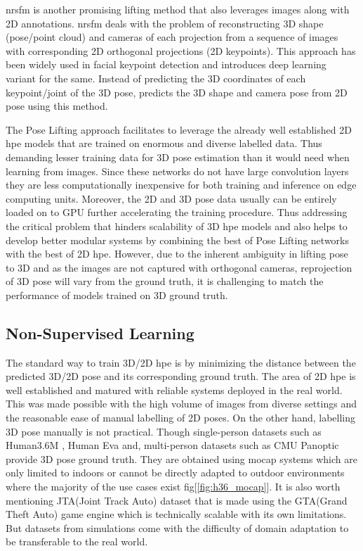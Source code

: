 \ac{nrsfm} is another promising lifting method that also leverages images along with 2D annotations. \ac{nrsfm} deals with the problem of reconstructing 3D shape (pose/point cloud) and cameras of each projection from a sequence of images with corresponding 2D orthogonal projections (2D keypoints). This approach has been widely used in facial keypoint detection and \cite{deepNRSFM} introduces deep learning variant for the same. Instead of predicting the 3D coordinates of each keypoint/joint of the 3D pose, \cite{DistillNRSfM, c3dpo, deepNRSFM, nrsfm++} predicts the 3D shape and camera pose from 2D pose using this method.

The Pose Lifting approach facilitates to leverage the already well established 2D \ac{hpe} models that are trained on enormous and diverse labelled data. Thus demanding lesser training data for 3D pose estimation than it would need when learning from images. Since these networks do not have large convolution layers they are less computationally inexpensive for both training and inference on edge computing units. Moreover, the 2D and 3D pose data usually can be entirely loaded on to GPU further accelerating the training procedure. Thus addressing the critical problem that hinders scalability of 3D \ac{hpe} models and also helps to develop better modular systems by combining the best of Pose Lifting networks with the best of 2D \ac{hpe}. However, due to the inherent ambiguity in lifting pose to 3D and as the images are not captured with orthogonal cameras, reprojection of 3D pose will vary from the ground truth, it is challenging to match the performance of models trained on 3D ground truth.

\subsection{Non-Supervised Learning}

The standard way to train 3D/2D \ac{hpe} is by minimizing the distance between the predicted 3D/2D pose and its corresponding ground truth. The area of 2D \ac{hpe} is well established and matured with reliable systems deployed in the real world. This was made possible with the high volume of images from diverse settings and the reasonable ease of manual labelling of 2D poses. On the other hand, labelling 3D pose manually is not practical. Though single-person datasets such as Human3.6M \cite{H3.6}, Human Eva \cite{HumanEva} and, multi-person datasets such as CMU Panoptic \cite{cmuPanoptic} provide 3D pose ground truth. They are obtained using \ac{mocap} systems which are only limited to indoors or cannot be directly adapted to outdoor environments where the majority of the use cases exist fig[\ref{fig:h36_mocap}]. It is also worth mentioning JTA(Joint Track Auto) dataset \cite{JTA} that is made using the GTA(Grand Theft Auto) game engine which is technically scalable with its own limitations. But datasets from simulations come with the difficulty of domain adaptation to be transferable to the real world.

